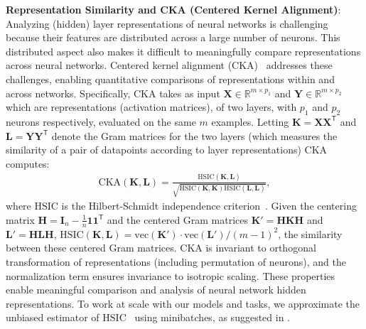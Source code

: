 \documentclass{article}
\begin{document}
\textbf{Representation Similarity and CKA (Centered Kernel Alignment)}: Analyzing (hidden) layer representations of neural networks is challenging because their features are distributed across a large number of neurons. This distributed aspect also makes it difficult to meaningfully compare representations across neural networks. Centered kernel alignment (CKA)~\cite{kornblith2019similarity,cortes2012algorithms} addresses these challenges, enabling quantitative comparisons of representations within and across networks. Specifically, CKA takes as input $\mathbf{X} \in \mathbb{R}^{m \times p_1}$ and $\mathbf{Y} \in \mathbb{R}^{m \times p_2}$ which are representations (activation matrices), of two layers, with $p_1$ and $p_2$ neurons respectively, evaluated on the same $m$ examples. Letting $\bm{K} = \bm{X}\bm{X}^\mathsf{T}$ and $\bm{L} = \bm{Y}\bm{Y}^\mathsf{T}$ denote the Gram matrices for the two layers (which measures the similarity of a pair of datapoints according to layer representations) CKA computes:
\begin{align}
    \mathrm{CKA}(\bm{K}, \bm{L}) = \frac{\mathrm{HSIC}(\bm{K}, \bm{L})}{\sqrt{\mathrm{HSIC}(\bm{K}, \bm{K}) \mathrm{HSIC}(\bm{L}, \bm{L})}},
\end{align}
where $\mathrm{HSIC}$ is the Hilbert-Schmidt independence criterion~\cite{gretton2007kernel}. Given the centering matrix $\bm{H} = \bm{I}_n - \frac{1}{n}\bm{1}\bm{1}^\mathsf{T}$ and the centered Gram matrices  $\bm{K}' = \bm{H}\bm{K}\bm{H}$ and $\bm{L}' = \bm{H}\bm{L}\bm{H}$, $\mathrm{HSIC}(\bm{K},\bm{L}) = \mathrm{vec}(\bm{K}') \cdot \mathrm{vec}(\bm{L}')/(m-1)^2$, the similarity between these centered Gram matrices. CKA is invariant to orthogonal transformation of representations (including permutation of neurons), and the normalization term ensures invariance to isotropic scaling. These properties enable meaningful comparison and analysis of neural network hidden representations. To work at scale with our models and tasks, we approximate the unbiased estimator of $\mathrm{HSIC}$~\cite{song2012feature} using minibatches, as suggested in \cite{nguyen2020wide}.
\end{document}
